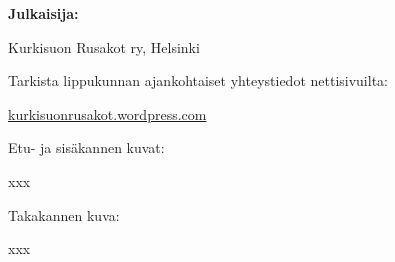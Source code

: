 \documentclass[10pt,finnish,a5paper]{scrartcl}
\begin{document}
\medskip

\noindent\textbf{Julkaisija:}

Kurkisuon Rusakot ry, Helsinki

\medskip

\noindent Tarkista lippukunnan ajankohtaiset yhteystiedot nettisivuilta:

\href{https://kurkisuonrusakot.wordpress.com/}{kurkisuonrusakot.wordpress.com}

\medskip

\noindent Etu- ja sisäkannen kuvat:

xxx

\noindent Takakannen kuva:

xxx

\vspace{0.64cm}

\tableofcontents





%














% 



\clearpage
\end{document}
